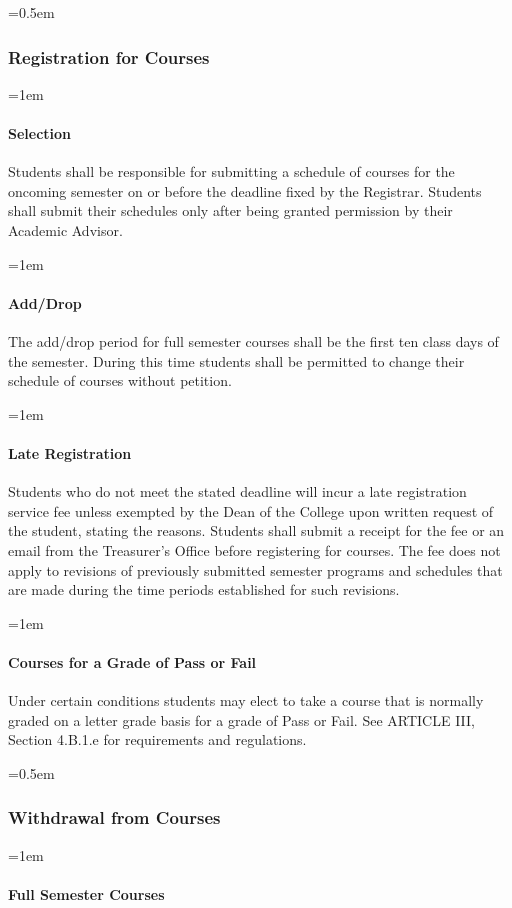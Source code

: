 \documentclass{manual}
\let\oldsubsubsection\subsubsection
\renewcommand\subsubsection{\leftskip=0.5em\oldsubsubsection}
\let\oldparagraph\paragraph
\renewcommand\paragraph{\leftskip=1em\oldparagraph}
\begin{document}
		\subsubsection{Registration for Courses}

			\paragraph{Selection}
			Students shall be responsible for submitting a schedule of courses for the oncoming semester on or before the deadline fixed by the Registrar. Students shall submit their schedules only after being granted permission by their Academic Advisor.

			\paragraph{Add/Drop}
			The add/drop period for full semester courses shall be the first ten class days of the semester. During this time students shall be permitted to change their schedule of courses without petition.

			\paragraph{Late Registration}
			Students who do not meet the stated deadline will incur a late registration service fee unless exempted by the Dean of the College upon written request of the student, stating the reasons. Students shall submit a receipt for the fee or an email from the Treasurer's Office before registering for courses. The fee does not apply to revisions of previously submitted semester programs and schedules that are made during the time periods established for such revisions.

			\paragraph{Courses for a Grade of \textbf{Pass} or Fail}\label{sub:CoursesForGradeOfPassOrFail}
			Under certain conditions students may elect to take a course that is normally graded on a letter grade basis for a grade of Pass or Fail. See ARTICLE III, Section 4.B.1.e for requirements and regulations.

		\subsubsection{Withdrawal from Courses}

			\paragraph{Full Semester Courses}
\end{document}
